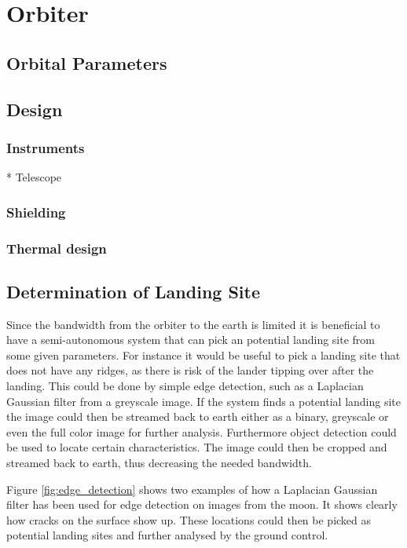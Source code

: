 \chapter{Orbiter}

\section{Orbital Parameters}

\section{Design}

\subsection{Instruments}

* Telescope

\subsection{Shielding}

\subsection{Thermal design}

\section{Determination of Landing Site}


Since the bandwidth from the orbiter to the earth is limited it is beneficial to have a semi-autonomous system that can pick an potential landing site from some given parameters. For instance it would be useful to pick a landing site that does not have any ridges, as there is risk of the lander tipping over after the landing. This could be done by simple edge detection, such as a Laplacian Gaussian filter from a greyscale image. If the system finds a potential landing site the image could then be streamed back to earth either as a binary, greyscale or even the full color image for further analysis. Furthermore object detection could be used to locate certain characteristics. The image could then be cropped and streamed back to earth, thus decreasing the needed bandwidth.

Figure \ref{fig:edge_detection} shows two examples of how a Laplacian Gaussian filter has been used for edge detection on images from the moon. It shows clearly how cracks on the surface show up. These locations could then be picked as potential landing sites and further analysed by the ground control.

